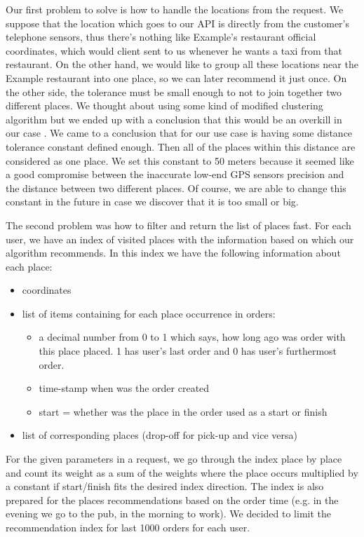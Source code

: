  Our first problem to solve is how to handle the locations from the request. We suppose that the location which goes to our API is directly from the customer's telephone sensors, thus there's nothing like Example's restaurant official coordinates, which would client sent to us whenever he wants a taxi from that restaurant. On the other hand, we would like to group all these locations near the Example restaurant into one place, so we can later recommend it just once. On the other side, the tolerance must be small enough to not to join together two different places. We thought about using some kind of modified clustering algorithm but we ended up with a conclusion that this would be an overkill in our case . We came to a conclusion that for our use case is having some distance tolerance constant defined enough. Then all of the places within this distance are considered as one place. We set this constant to 50 meters because it seemed like a good compromise between the inaccurate low-end GPS sensors precision and the distance between two different places. Of course, we are able to change this constant in the future in case we discover that it is too small or big.
 
 The second problem was how to filter and return the list of places fast. For each user, we have an index of visited places with the information based on which our algorithm recommends. In this index we have the following information about each place:
 \begin{itemize}
 	\item coordinates
 	\item list of items containing for each place occurrence in orders:
 	\begin{itemize}
 		\item a decimal number from 0 to 1 which says, how long ago was order with this place placed. 1 has user's last order and 0 has user's furthermost order.
 		\item time-stamp when was the order created
 		\item start = whether was the place in the order used as a start or finish
 	\end{itemize}
 	\item list of corresponding places (drop-off for pick-up and vice versa)
 \end{itemize}
For the given parameters in a request, we go through the index place by place and count its weight as a sum of the weights where the place occurs multiplied by a constant if start/finish fits the desired index direction. The index is also prepared for the places recommendations based on the order time (e.g. in the evening we go to the pub, in the morning to work). We decided to limit the recommendation index for last 1000 orders for each user.

